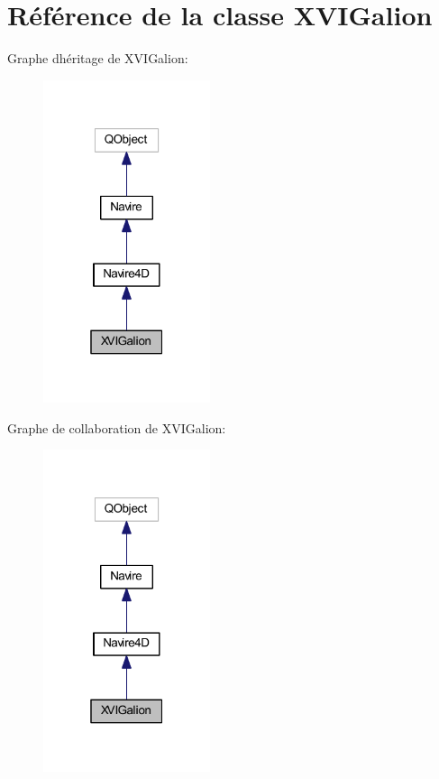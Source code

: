 \hypertarget{class_x_v_i_galion}{}\section{Référence de la classe X\+V\+I\+Galion}
\label{class_x_v_i_galion}


Graphe d\textquotesingle{}héritage de X\+V\+I\+Galion\+:
\nopagebreak
\begin{figure}[H]
\begin{center}
\leavevmode
\includegraphics[width=139pt]{class_x_v_i_galion__inherit__graph}
\end{center}
\end{figure}


Graphe de collaboration de X\+V\+I\+Galion\+:
\nopagebreak
\begin{figure}[H]
\begin{center}
\leavevmode
\includegraphics[width=139pt]{class_x_v_i_galion__coll__graph}
\end{center}
\end{figure}
